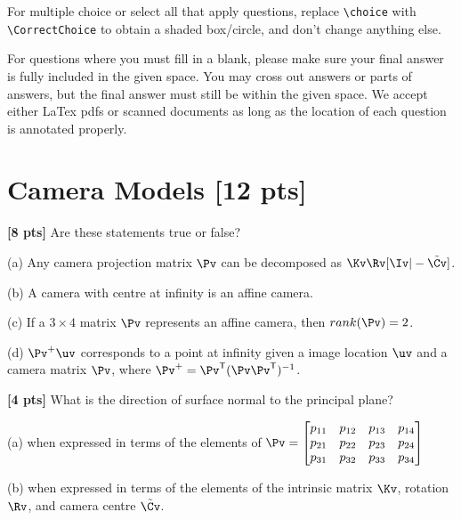 \documentclass[11pt,addpoints,answers]{exam}
\numberwithin{equation}{section} %
\numberwithin{figure}{section} %
\numberwithin{table}{section} %
\begin{document}
For multiple choice or select all that apply questions, replace \lstinline{\choice} with \lstinline{\CorrectChoice} to obtain a shaded box/circle, and don't change anything else.


For questions where you must fill in a blank, please make sure your final answer is fully included in the given space. You may cross out answers or parts of answers, but the final answer must still be within the given space. We accept either LaTex pdfs or scanned documents as long as the location of each question is annotated properly.


\clearpage

\section{Camera Models  [12 pts]}
\begin{questions}

\question \textbf{[8 pts]} Are these statements true or false?

(a) Any camera projection matrix $\Pv$ can be decomposed as $\Kv\Rv[\Iv | -\tilde{\Cv}]$.

(b) A camera with centre at infinity is an affine camera.

(c) If a $3\times 4$ matrix $\Pv$ represents an affine camera, then $rank(\Pv)=2$.

(d) $\Pv^{+}\uv$ corresponds to a point at infinity given a image location $\uv$ and a camera matrix $\Pv$, where $\Pv^{+} = \Pv^{\mathsf{T}}(\Pv\Pv^{\mathsf{T}})^{-1}$.

\begin{tcolorbox}[fit,height=18cm, width=\textwidth, blank, borderline={0.5pt}{-2pt},halign=left, valign=center, nobeforeafter]


\end{tcolorbox}

\question \textbf{[4 pts]} What is the direction of surface normal to the principal plane? 

(a) when expressed in terms of the elements of $\Pv = \begin{bmatrix}
p_{11} & p_{12} & p_{13} & p_{14} \\ 
p_{21} & p_{22} & p_{23} & p_{24} \\ 
p_{31} & p_{32} & p_{33} & p_{34}
\end{bmatrix}$

(b) when expressed in terms of the elements of the intrinsic matrix $\Kv$, rotation $\Rv$, and camera centre $\tilde{\Cv}$.


\end{questions}
\end{document}
